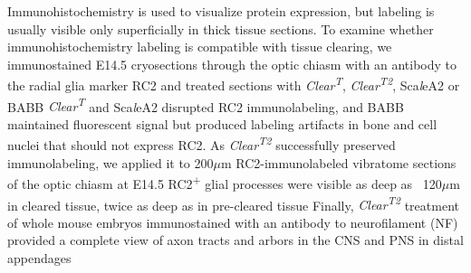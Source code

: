Immunohistochemistry is used to visualize protein expression, but labeling is usually visible only superficially in thick tissue sections.
To examine whether immunohistochemistry labeling is compatible with tissue clearing, we immunostained E14.5 cryosections through the optic chiasm with an antibody to the radial glia marker RC2 and treated sections with \emph{Clear\textsuperscript{T}}, \emph{Clear\textsuperscript{T2}}, Sca\emph{l}eA2 or BABB %
\emph{Clear\textsuperscript{T}} and Sca\emph{l}eA2 disrupted RC2 immunolabeling, and BABB maintained fluorescent signal but produced labeling artifacts in bone and cell nuclei that should not express RC2.
As \emph{Clear\textsuperscript{T2}} successfully preserved immunolabeling, we applied it to 200$\mu$m RC2-immunolabeled vibratome sections of the optic chiasm at E14.5 %
RC2\textsuperscript{+} glial processes were visible as deep as ~120$\mu$m in cleared tissue, twice as deep as in pre-cleared tissue %
Finally, \emph{Clear\textsuperscript{T2}} treatment of whole mouse embryos immunostained with an antibody to neurofilament (NF) provided a complete view of axon tracts and arbors in the CNS and PNS in distal appendages %
